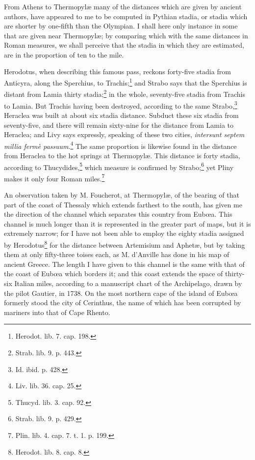 \documentclass[a4paper, 11pt, oneside, polutonikogreek, english]{article}
\begin{document}
From Athens to Thermopylæ many of the distances which are given by ancient authors, have appeared to me to be computed in Pythian stadia, or stadia which are shorter by one-fifth than the Olympian. I shall here only instance in some that are given near Thermopylæ; by comparing which with the same distances in Roman measures, we shall perceive that the stadia in which they are estimated, are in the proportion of ten to the mile.

Herodotus, when describing this famous pass, reckons forty-five stadia from Anticyra, along the Sperchius, to Trachis;\footnote{Herodot. lib. 7. cap. 198.} and Strabo says that the Sperchius is distant from Lamia thirty stadia;\footnote{Strab. lib. 9. p. 443.} in the whole, seventy-five stadia from Trachis to Lamia. But Trachis having been destroyed, according to the same Strabo,\footnote{Id. ibid. p. 428.} Heraclea was built at about six stadia distance. Subduct these six stadia from seventy-five, and there will remain sixty-nine for the distance from Lamia to Heraclea; and Livy says expressly, speaking of these two cities, \emph{intersunt septem millia fermè passuum}.\footnote{Liv. lib. 36. cap. 25.} The same proportion is likewise found in the distance from Heraclea to the hot springs at Thermopylæ. This distance is forty stadia, according to Thucydides,\footnote{Thucyd. lib. 3. cap. 92.} which measure is confirmed by Strabo;\footnote{Strab. lib. 9. p. 429.} yet Pliny makes it only four Roman miles.\footnote{Plin. lib. 4. cap. 7. t. 1. p. 199.}

An observation taken by M. Foucherot, at Thermopylæ, of the bearing of that part of the coast of Thessaly which extends farthest to the south, has given me the direction of the channel which separates this country from Eubœa. This channel is much longer than it is represented in the greater part of maps, but it is extremely narrow; for I have not been able to employ the eighty stadia assigned by Herodotus\footnote{Herodot. lib. 8. cap. 8.} for the distance between Artemisium and Aphetæ, but by taking them at only fifty-three toises each, as M. d'Anville has done in his map of ancient Greece. The length I have given to this channel is the same with that of the coast of Eubœa which borders it; and this coast extends the space of thirty-six Italian miles, according to a manuscript chart of the Archipelago, drawn by the pilot Gautier, in 1738. On the most northern cape of the island of Eubœa formerly stood the city of Cerinthus, the name of which has been corrupted by mariners into that of Cape Rhento.
\end{document}
